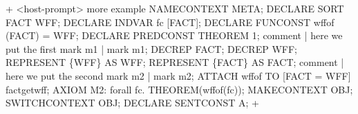 



\gfexample+
   <host-prompt> more example
   NAMECONTEXT META;
   DECLARE SORT FACT WFF;
   DECLARE INDVAR fc [FACT];
   DECLARE FUNCONST wffof (FACT) = WFF;
   DECLARE PREDCONST THEOREM 1;
   comment | here we put the first mark m1 |
   mark m1;
   DECREP FACT;
   DECREP WFF;
   REPRESENT \{WFF\} AS WFF;
   REPRESENT \{FACT\} AS FACT;
   comment | here we put the second mark m2 |
   mark m2;
   ATTACH wffof TO [FACT = WFF] fact\-get\-wff;
   AXIOM M2: forall fc. THEOREM(wffof(fc));
   MAKECONTEXT OBJ;
   SWITCHCONTEXT OBJ;
   DECLARE SENTCONST A;
+


